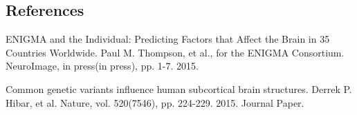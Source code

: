 \documentclass[twocolumn]{bmcart}%
\begin{document}
\begin{backmatter}

\section{References}\label{references}
ENIGMA and the Individual: Predicting Factors that Affect the Brain in 35 Countries Worldwide. Paul M. Thompson, et al., for the ENIGMA Consortium. NeuroImage, in press(in press), pp. 1-7. 2015.

Common genetic variants influence human subcortical brain structures. Derrek P. Hibar, et al. Nature, vol. 520(7546), pp. 224-229. 2015. Journal Paper.


\end{backmatter}
\end{document}
